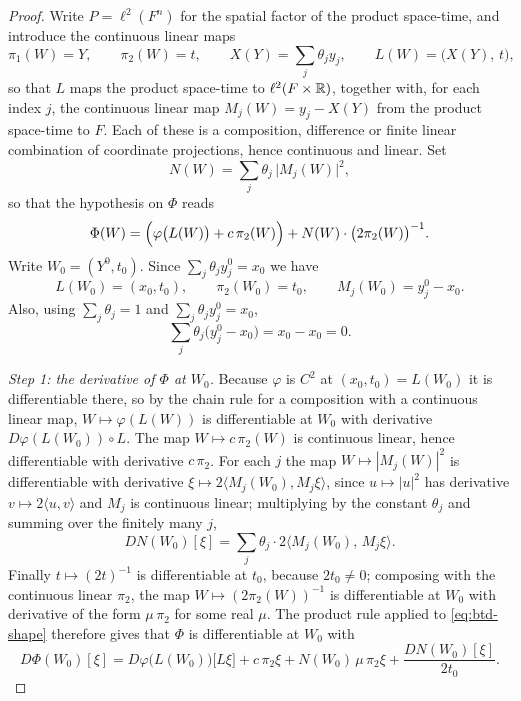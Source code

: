 \begin{proof}
Write $P=\ell^2(F^n)$ for the spatial factor of the product space-time, and introduce the
continuous linear maps
\[
  \pi_1(W)=Y,\qquad \pi_2(W)=t,\qquad
  X(Y)=\sum_j\theta_jy_j,\qquad
  L(W)=\bigl(X(Y),\,t\bigr),
\]
so that $L$ maps the product space-time to $\ell^2(F\times\mathbb{R})$, together with, for each
index $j$, the continuous linear map $M_j(W)=y_j-X(Y)$ from the product space-time to
$F$. Each of these is a composition, difference or finite linear combination of
coordinate projections, hence continuous and linear. Set
\[
  N(W)=\sum_j\theta_j\,\bigl|M_j(W)\bigr|^2 ,
\]
so that the hypothesis on $\Phi$ reads
\begin{equation}\label{eq:btd-shape}
  \Phi(W)=\Bigl(\varphi\bigl(L(W)\bigr)+c\,\pi_2(W)\Bigr)+N(W)\cdot\bigl(2\pi_2(W)\bigr)^{-1}.
\end{equation}
Write $W_0=(Y^0,t_0)$. Since $\sum_j\theta_jy^0_j=x_0$ we have
\begin{equation}\label{eq:btd-base}
  L(W_0)=(x_0,t_0),\qquad \pi_2(W_0)=t_0,\qquad M_j(W_0)=y^0_j-x_0 .
\end{equation}
Also, using $\sum_j\theta_j=1$ and $\sum_j\theta_jy^0_j=x_0$,
\begin{equation}\label{eq:btd-off}
  \sum_j\theta_j\bigl(y^0_j-x_0\bigr)=x_0-x_0=0 .
\end{equation}

\emph{Step 1: the derivative of $\Phi$ at $W_0$.}
Because $\varphi$ is $C^2$ at $(x_0,t_0)=L(W_0)$ it is differentiable there, so by the
chain rule for a composition with a continuous linear map, $W\mapsto\varphi(L(W))$ is
differentiable at $W_0$ with derivative $D\varphi(L(W_0))\circ L$. The map
$W\mapsto c\,\pi_2(W)$ is continuous linear, hence differentiable with derivative
$c\,\pi_2$. For each $j$ the map $W\mapsto|M_j(W)|^2$ is differentiable with derivative
$\xi\mapsto2\langle M_j(W_0),M_j\xi\rangle$, since $u\mapsto|u|^2$ has derivative
$v\mapsto2\langle u,v\rangle$ and $M_j$ is continuous linear; multiplying by the constant
$\theta_j$ and summing over the finitely many $j$,
\begin{equation}\label{eq:btd-DN}
  DN(W_0)[\xi]=\sum_j\theta_j\cdot2\bigl\langle M_j(W_0),\,M_j\xi\bigr\rangle .
\end{equation}
Finally $t\mapsto(2t)^{-1}$ is differentiable at $t_0$, because $2t_0\neq0$; composing
with the continuous linear $\pi_2$, the map $W\mapsto(2\pi_2(W))^{-1}$ is differentiable
at $W_0$ with derivative of the form $\mu\,\pi_2$ for some real $\mu$. The product rule
applied to \eqref{eq:btd-shape} therefore gives that $\Phi$ is differentiable at $W_0$
with
\begin{equation}\label{eq:btd-DPhi}
  D\Phi(W_0)[\xi]
   =D\varphi\bigl(L(W_0)\bigr)\bigl[L\xi\bigr]+c\,\pi_2\xi
     +N(W_0)\,\mu\,\pi_2\xi+\frac{DN(W_0)[\xi]}{2t_0}.
\end{equation}


\end{proof}
